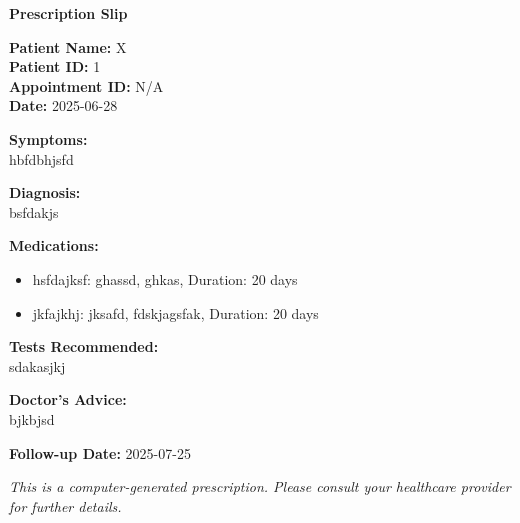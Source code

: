 \documentclass[a4paper,12pt]{article}
\begin{document}
            
            \begin{center}
                \textbf{\Large Prescription Slip}
                \vspace{0.5cm}
                \hrulefill
            \end{center}
            
            \vspace{0.5cm}
            
            \textbf{Patient Name:} X \\
            \textbf{Patient ID:} 1 \\
            \textbf{Appointment ID:} N/A \\
            \textbf{Date:} 2025-06-28 \\
            
            \vspace{0.5cm}
            
            \textbf{Symptoms:} \\
            hbfdbhjsfd \\
            
            \vspace{0.3cm}
            
            \textbf{Diagnosis:} \\
            bsfdakjs \\
            
            \vspace{0.3cm}
            
            \textbf{Medications:}
            \begin{itemize}[leftmargin=*]
            \item hsfdajksf: ghassd, ghkas, Duration: 20 days\item jkfajkhj: jksafd, fdskjagsfak, Duration: 20 days
            \end{itemize}
            
            \vspace{0.3cm}
            
            \textbf{Tests Recommended:} \\
            sdakasjkj \\
            
            \vspace{0.3cm}
            
            \textbf{Doctor's Advice:} \\
            bjkbjsd \\
            
            \vspace{0.3cm}
            
            \textbf{Follow-up Date:} 2025-07-25 \\
            
            \vspace{0.5cm}
            
            \textit{This is a computer-generated prescription. Please consult your healthcare provider for further details.}
            
            
\end{document}
